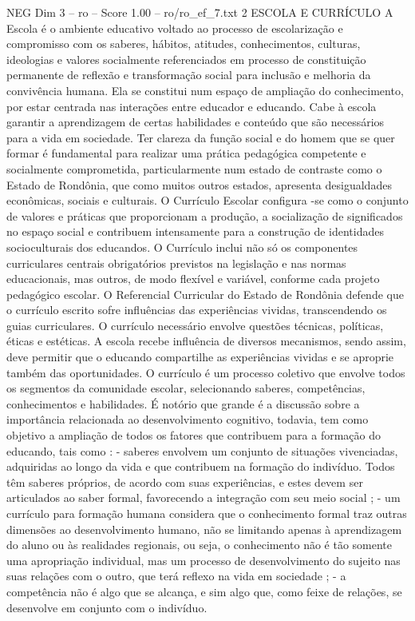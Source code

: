 \begin{textsample}{NEG Dim 3 – ro – Score 1.00 – ro/ro\_ef\_7.txt}  \label{ex:f3_neg_155}
2 ESCOLA E CURRÍCULO A Escola é o ambiente educativo voltado ao processo de escolarização e compromisso com os saberes, hábitos, atitudes, conhecimentos, culturas, ideologias e valores socialmente referenciados em processo de constituição permanente de reflexão e transformação social para inclusão e melhoria da convivência humana.
Ela se constitui num espaço de ampliação do conhecimento, por estar centrada nas interações entre educador e educando.
Cabe à escola garantir a aprendizagem de certas habilidades e conteúdo que são necessários para a vida em sociedade.
Ter clareza da função social e do homem que se quer formar é fundamental para realizar uma prática pedagógica competente e socialmente comprometida, particularmente num estado de contraste como o Estado de Rondônia, que como muitos outros estados, apresenta desigualdades econômicas, sociais e culturais.
O Currículo Escolar configura -se como o conjunto de valores e práticas que proporcionam a produção, a socialização de significados no espaço social e contribuem intensamente para a construção de identidades socioculturais dos educandos.
O Currículo inclui não só os componentes curriculares centrais obrigatórios previstos na legislação e nas normas educacionais, mas outros, de modo flexível e variável, conforme cada projeto pedagógico escolar.
O Referencial Curricular do Estado de Rondônia defende que o currículo escrito sofre influências das experiências vividas, transcendendo os guias curriculares.
O currículo necessário envolve questões técnicas, políticas, éticas e estéticas.
A escola recebe influência de diversos mecanismos, sendo assim, deve permitir que o educando compartilhe as experiências vividas e se aproprie também das oportunidades.
O currículo é um processo coletivo que envolve todos os segmentos da comunidade escolar, selecionando saberes, competências, conhecimentos e habilidades.
É notório que grande é a discussão sobre a importância relacionada ao desenvolvimento cognitivo, todavia, tem como objetivo a ampliação de todos os fatores que contribuem para a formação do educando, tais como : - saberes envolvem um conjunto de situações vivenciadas, adquiridas ao longo da vida e que contribuem na formação do indivíduo.
Todos têm saberes próprios, de acordo com suas experiências, e estes devem ser articulados ao saber formal, favorecendo a integração com seu meio social ; - um currículo para formação humana considera que o conhecimento formal traz outras dimensões ao desenvolvimento humano, não se limitando apenas à aprendizagem do aluno ou às realidades regionais, ou seja, o conhecimento não é tão somente uma apropriação individual, mas um processo de desenvolvimento do sujeito nas suas relações com o outro, que terá reflexo na vida em sociedade ; - a competência não é algo que se alcança, e sim algo que, como feixe de relações, se desenvolve em conjunto com o indivíduo.

\end{textsample}
